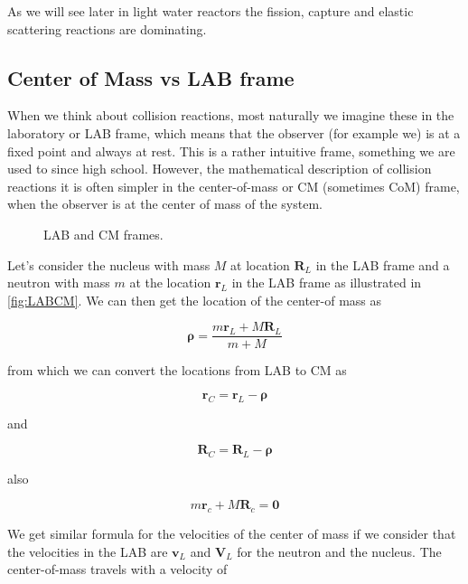 As we will see later in light water reactors the fission, capture and elastic scattering reactions are dominating.

\subsection{Center of Mass vs LAB frame}

When we think about collision reactions, most naturally we imagine these in the laboratory or LAB frame, which means that the observer (for example we) is at a fixed point and always at rest. This is a rather intuitive frame, something we are used to since high school. However, the mathematical description of collision reactions it is often simpler in the center-of-mass or CM (sometimes CoM) frame, when the observer is at the center of mass of the system. 

\begin{figure}[ht!]
\protect {}\protect
\caption{\label{fig:LABCM} \footnotesize{LAB and CM frames.}}
\end{figure}

Let's consider the nucleus with mass $M$ at location $\mathbf{R}_L$ in the LAB frame and a neutron with mass $m$ at the location $\mathbf{r}_L$ in the LAB frame as illustrated in \autoref{fig:LABCM}. We can then get the location of the center-of mass as 

\begin{equation}
\mathbf{\rho} = \frac{m\mathbf{r}_L+M\mathbf{R}_L}{m+M}
\end{equation}

from which we can convert the locations from LAB to CM as 

\begin{equation}
\mathbf{r}_C=\mathbf{r}_L - \mathbf{\rho}
\end{equation}

\noindent and

\begin{equation}
\mathbf{R}_C=\mathbf{R}_L - \mathbf{\rho}
\end{equation}

\noindent also

$$m\mathbf{r}_c + M\mathbf{R}_c = \mathbf{0}$$

We get similar formula for the velocities of the center of mass if we consider that the velocities in the LAB are $\mathbf{v}_L$ and $\mathbf{V}_L$ for the neutron and the nucleus. The center-of-mass travels with a velocity of

